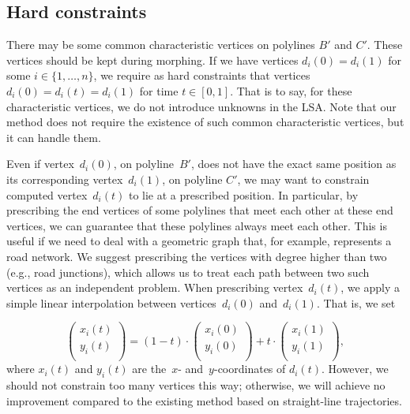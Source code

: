 \subsection{Hard constraints}
\label{sec:Morph_HardConstraints}

There may be some common characteristic vertices on 
polylines $B'$ and $C'$. 
These vertices should be kept during morphing. 
If we have vertices $d_{i}(0) = d_{i}(1)$
for some $i\in \{1,\ldots,n\}$, 
we require as hard constraints that vertices
$d_{i}(0) = d_{i}(t) = d_{i}(1)$ for time $t \in [0,1]$.
That is to say, for these characteristic vertices, 
we do not introduce unknowns in the LSA. 
Note that our method does not require 
the existence of such common characteristic vertices, 
but it can handle them.

Even if vertex~$d_{i}(0)$, on polyline~$B'$, 
does not have the exact same position 
as its corresponding vertex~$d_{i}(1)$, on polyline $C'$, 
we may want to constrain computed vertex~$d_{i}(t)$ 
to lie at a prescribed position. 
In particular, by prescribing the end vertices of 
some polylines that meet each other at these end vertices,
we can guarantee that these polylines always meet each other.
This is useful if we need to deal with a geometric graph
that, for example, represents a road network. 
We suggest prescribing the vertices 
with degree higher than two (e.g., road junctions), 
which allows us to treat each path between two such vertices 
as an independent problem. 
When prescribing vertex~$d_{i}(t)$, 
we apply a simple linear interpolation 
between vertices~$d_{i}(0)$ and~$d_{i}(1)$. 
That is, we set

\begin{equation}
\label{eq:Morph_HardConstraints}
\begin{pmatrix}
x_{i}(t) \\
y_{i}(t) \\
\end{pmatrix}
= (1 - t) \cdot
\begin{pmatrix}
x_{i}(0) \\
y_{i}(0) \\
\end{pmatrix}
+ t \cdot
\begin{pmatrix}
x_{i}(1) \\
y_{i}(1) \\
\end{pmatrix}, \nonumber
\end{equation}
where $x_{i}(t)$ and $y_{i}(t)$ are 
the~$x$- and~$y$-coordinates of $d_{i}(t)$. 
However, we should not constrain too many vertices this way;
otherwise, we will achieve no improvement compared to 
the existing method based on straight-line trajectories.


